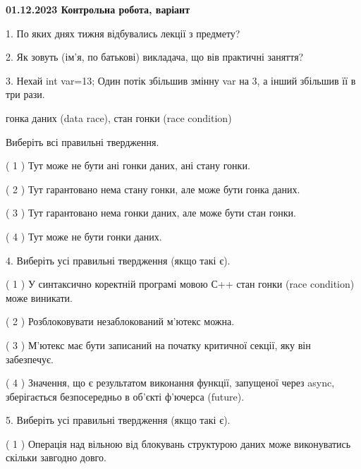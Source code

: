 \documentclass[12pt, ukrainian]{article}
\begin{document}
\vspace{4mm}
\newpage
\begin {large}

\textbf{01.12.2023 Контрольна робота, варіант  }\par


{
1. По яких днях тижня відбувались лекції з предмету?



\vspace{5mm}
2. Як зовуть (ім'я, по батькові) викладача, що вів практичні заняття?



\vspace{5mm}
3. Нехай int var=13; Один потік збільшив змінну var на 3, а інший збільшив її в три рази.

гонка даних (data race), стан гонки (race condition)

Виберіть всі правильні твердження.\par
\vspace{2mm}
( 1 ) Тут може не бути ані гонки даних, ані стану гонки.%

( 2 ) Тут гарантовано нема стану гонки, але може бути гонка даних.%

( 3 ) Тут гарантовано нема гонки даних, але може бути стан гонки.%

( 4 ) Тут може не бути гонки даних.%


\vspace{5mm}
4. Виберіть усі правильні твердження (якщо такі є).\par
\vspace{2mm}

( 1 ) У синтаксично коректній програмі мовою С++ стан гонки (race condition) може виникати.%

( 2 ) Розблоковувати незаблокований м’ютекс можна.%

( 3 ) М’ютекс має бути записаний на початку критичної секції, яку він забезпечує.%

( 4 ) Значення, що є результатом виконання функції, запущеної через async, зберігається безпосередньо в об’єкті ф’ючерса (future).%


\vspace{5mm}
5. Виберіть усі правильні твердження (якщо такі є).\par
\vspace{2mm}

( 1 ) Операція над вільною від блокувань структурою даних може виконуватись скільки завгодно довго.%

}
\end{large}
\end{document}
